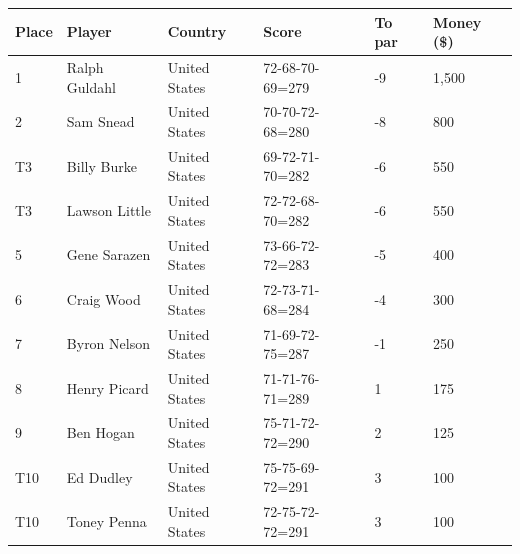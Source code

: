 \documentclass{article}
\begin{document}
\begin{tabular}{llllll}
\toprule
Place & Player & Country & Score & To par & Money (\$) \\
\midrule
1 & Ralph Guldahl & United States & 72-68-70-69=279 & -9 & 1,500 \\
2 & Sam Snead & United States & 70-70-72-68=280 & -8 & 800 \\
T3 & Billy Burke & United States & 69-72-71-70=282 & -6 & 550 \\
T3 & Lawson Little & United States & 72-72-68-70=282 & -6 & 550 \\
5 & Gene Sarazen & United States & 73-66-72-72=283 & -5 & 400 \\
6 & Craig Wood & United States & 72-73-71-68=284 & -4 & 300 \\
7 & Byron Nelson & United States & 71-69-72-75=287 & -1 & 250 \\
8 & Henry Picard & United States & 71-71-76-71=289 & 1 & 175 \\
9 & Ben Hogan & United States & 75-71-72-72=290 & 2 & 125 \\
T10 & Ed Dudley & United States & 75-75-69-72=291 & 3 & 100 \\
T10 & Toney Penna & United States & 72-75-72-72=291 & 3 & 100 \\
\bottomrule
\end{tabular}
\end{document}
